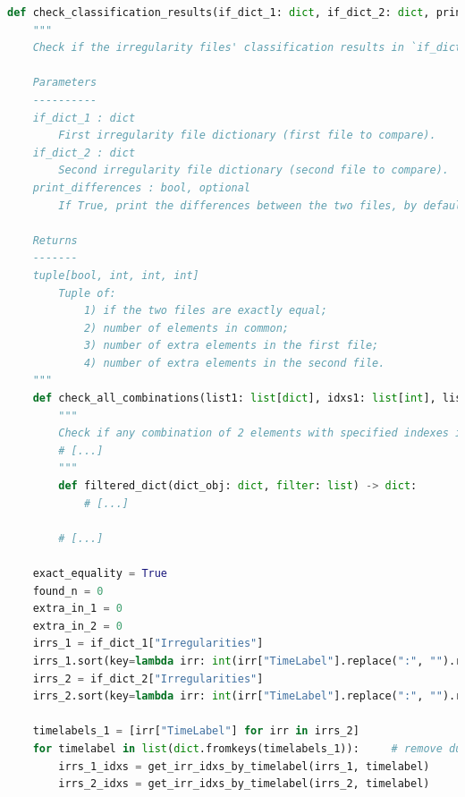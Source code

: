 \begin{lstlisting}[language=Python]
def check_classification_results(if_dict_1: dict, if_dict_2: dict, print_differences: bool = False) -> (bool, int, int, int):
    """
    Check if the irregularity files' classification results in `if_dict_1` are exactly equal to `if_dict_2`.

    Parameters
    ----------
    if_dict_1 : dict
        First irregularity file dictionary (first file to compare).
    if_dict_2 : dict
        Second irregularity file dictionary (second file to compare).
    print_differences : bool, optional
        If True, print the differences between the two files, by default False.

    Returns
    -------
    tuple[bool, int, int, int]
        Tuple of:
            1) if the two files are exactly equal;
            2) number of elements in common;
            3) number of extra elements in the first file;
            4) number of extra elements in the second file.
    """
    def check_all_combinations(list1: list[dict], idxs1: list[int], list2: list[dict], idxs2: list[int]) -> (int | None, int | None):
        """
        Check if any combination of 2 elements with specified indexes in two different lists is equal and return the indexes of the first equal elements found.
        # [...]
        """
        def filtered_dict(dict_obj: dict, filter: list) -> dict:
            # [...]

        # [...]

    exact_equality = True
    found_n = 0
    extra_in_1 = 0
    extra_in_2 = 0
    irrs_1 = if_dict_1["Irregularities"]
    irrs_1.sort(key=lambda irr: int(irr["TimeLabel"].replace(":", "").replace(".", "")))  # FIXME workaround for ":" timelabel problem from video analyser
    irrs_2 = if_dict_2["Irregularities"]
    irrs_2.sort(key=lambda irr: int(irr["TimeLabel"].replace(":", "").replace(".", "")))

    timelabels_1 = [irr["TimeLabel"] for irr in irrs_2]
    for timelabel in list(dict.fromkeys(timelabels_1)):     # remove duplicates
        irrs_1_idxs = get_irr_idxs_by_timelabel(irrs_1, timelabel)
        irrs_2_idxs = get_irr_idxs_by_timelabel(irrs_2, timelabel)


\end{lstlisting}
